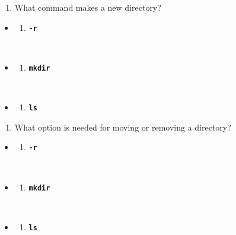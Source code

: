 \documentclass[
  letterpaper,
  DIV=11,
  numbers=noendperiod]{scrreprt}
\providecommand{\tightlist}{%
  \setlength{\itemsep}{0pt}\setlength{\parskip}{0pt}}\usepackage{longtable,booktabs,array}
\begin{document}
\begin{enumerate}
\def\labelenumi{\arabic{enumi}.}
\setcounter{enumi}{2}
\tightlist
\item
  What command makes a new directory?
\end{enumerate}

\begin{itemize}
\item
  \begin{enumerate}
  \def\labelenumi{(\Alph{enumi})}
  \tightlist
  \item
    \textbf{\texttt{-r}}\strut \\
  \end{enumerate}
\item
  \begin{enumerate}
  \def\labelenumi{(\Alph{enumi})}
  \setcounter{enumi}{1}
  \tightlist
  \item
    \textbf{\texttt{mkdir}}\strut \\
  \end{enumerate}
\item
  \begin{enumerate}
  \def\labelenumi{(\Alph{enumi})}
  \setcounter{enumi}{2}
  \tightlist
  \item
    \textbf{\texttt{ls}}
  \end{enumerate}
\end{itemize}

\begin{enumerate}
\def\labelenumi{\arabic{enumi}.}
\setcounter{enumi}{3}
\tightlist
\item
  What option is needed for moving or removing a directory?
\end{enumerate}

\begin{itemize}
\item
  \begin{enumerate}
  \def\labelenumi{(\Alph{enumi})}
  \tightlist
  \item
    \textbf{\texttt{-r}}\strut \\
  \end{enumerate}
\item
  \begin{enumerate}
  \def\labelenumi{(\Alph{enumi})}
  \setcounter{enumi}{1}
  \tightlist
  \item
    \textbf{\texttt{mkdir}}\strut \\
  \end{enumerate}
\item
  \begin{enumerate}
  \def\labelenumi{(\Alph{enumi})}
  \setcounter{enumi}{2}
  \tightlist
  \item
    \textbf{\texttt{ls}}
  \end{enumerate}
\end{itemize}
\end{document}
